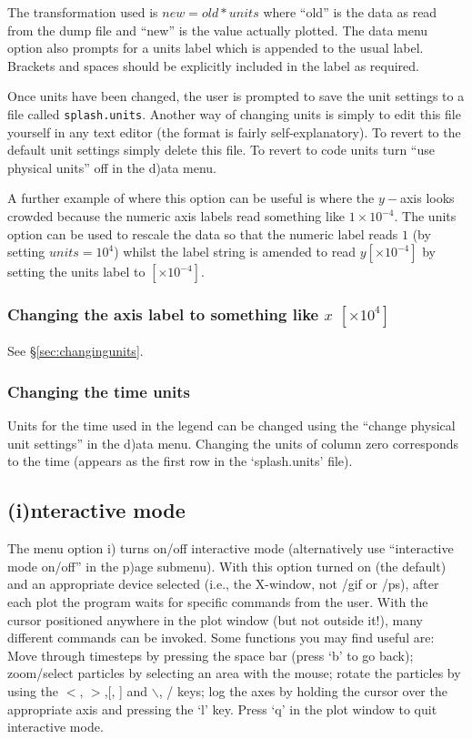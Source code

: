 \documentclass[a4paper,10pt]{article}
\begin{document}
 The transformation used is $new= old*units$ where ``old'' is the data as read from the dump file and ``new'' is the value actually plotted. The data menu option also prompts for a units label which is appended to the usual label. Brackets and spaces should be explicitly included in the label as required.
 
  Once units have been changed, the user is prompted to save the unit settings to a file called \verb+splash.units+. Another way of changing units is simply to edit this file yourself in any text editor (the format is fairly self-explanatory). To revert to the default unit settings simply delete this file. To revert to code units turn ``use physical units'' off in the d)ata menu.
 
 A further example of where this option can be useful is where the $y-$axis looks crowded because the numeric axis labels read something
like $1\times 10^{-4}$. The units option can be used to rescale the data so
that the numeric label reads $1$ (by setting $units=10^{4}$) whilst the label string is amended to read $y
[\times 10^{-4}]$ by setting the units label to $ [ \times 10^{-4}]$.

\subsubsection{ Changing the axis label to something like $x$ $[ \times 10^{4} ]$}
See \S\ref{sec:changingunits}.

\subsubsection{ Changing the time units}
\label{sec:timeunits}
Units for the time used in the legend can be changed using the ``change physical unit settings'' in the d)ata menu. Changing the units of column zero corresponds to the time (appears as the first row in the `splash.units' file). 

\subsection{(i)nteractive mode}%
\label{sec:interactive}
 The menu option i) turns on/off interactive mode (alternatively use ``interactive mode on/off'' in the p)age submenu). With this option turned on (the default) and
an appropriate device selected (i.e., the X-window, not /gif or /ps), after
each plot the program waits for specific commands from the user. With the cursor
positioned anywhere in the plot window (but not outside it!), many different
commands can be invoked. Some functions you may find useful are: Move through timesteps by pressing the space bar (press
 `b' to go back); zoom/select particles by selecting an area with the mouse; rotate the
particles by using the $<$, $>$,[, ] and $\backslash$, / keys; log the axes by holding the cursor
over the appropriate axis and pressing the `l' key. Press `q' in the plot window
to quit interactive mode.
\end{document}
